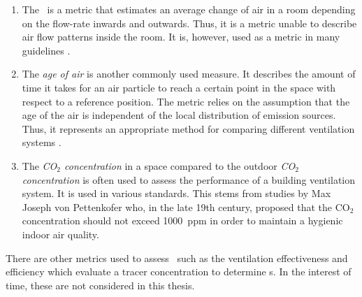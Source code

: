 \begin{enumerate}
\item The \textit{\ACR}\ is a metric that estimates an average change of air in a room depending on the flow-rate inwards and outwards. Thus, it is a metric unable to describe air flow patterns inside the room. It is, however, used as a metric in many guidelines \citep{Limb1995, Humphreys2006}.

\item The \textit{age of air} is another commonly used measure. It describes the amount of time it takes for an air particle to reach a certain point in the space with respect to a reference position. The metric relies on the assumption that the age of the air is independent of the local distribution of emission sources. Thus, it represents an appropriate method for comparing different ventilation systems \citep{SHERMAN2007}.

\item The \textit{CO$_2$ concentration} in a space compared to the outdoor \textit{CO$_2$ concentration} is often used to assess the performance of a building ventilation system. It is used in various standards. This stems from studies by Max Joseph von Pettenkofer who, in the late 19th century, proposed that the CO$_2$ concentration should not exceed \SI{1000}{ppm} in order to maintain a hygienic indoor air quality.
\end{enumerate}


There are other metrics used to assess \NVP\ such as the ventilation effectiveness and efficiency which evaluate a tracer concentration to determine \ACR s. In the interest of time, these are not considered in this thesis.









